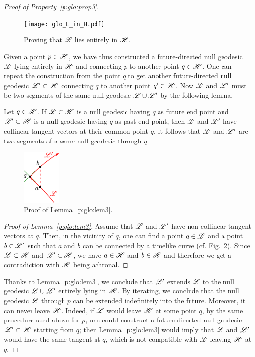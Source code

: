 \begin{proof}[Proof of Property~\ref{p:glo:prop3}]
\begin{figure}
\centerline{\texttt{[image: glo\_L\_in\_H.pdf]}}
\caption[]{\label{f:glo:L_in_H} \footnotesize
Proving that $\mathscr{L}$ lies entirely in $\mathscr{H}$.}
\end{figure}



Given a point $p\in\mathscr{H}$, we have thus constructed a
future-directed null geodesic $\mathscr{L}$ lying entirely in $\mathscr{H}$ and
connecting $p$ to another point $q\in\mathscr{H}$. One can
repeat the construction
from the point $q$ to get another future-directed null geodesic $\mathscr{L}'\subset\mathscr{H}$
connecting $q$ to another point $q'\in\mathscr{H}$. Now $\mathscr{L}$ and $\mathscr{L}'$ must
be two segments of the same null geodesic $\mathscr{L}\cup\mathscr{L}'$ by the following lemma.
\begin{lemma}
\label{p:glo:lem3}
Let $q\in\mathscr{H}$. If $\mathscr{L}\subset\mathscr{H}$ is a null geodesic having $q$ as future end point
and $\mathscr{L}'\subset\mathscr{H}$ is a null geodesic having $q$ as past end point, then
$\mathscr{L}$ and $\mathscr{L}'$ have collinear tangent vectors at their common point $q$.
It follows that $\mathscr{L}$ and $\mathscr{L}'$ are two segments of a same null geodesic through $q$.
\end{lemma}
\begin{figure}
\centerline{\includegraphics[width=0.17\textwidth]{glo_unique_geod.pdf}}
\caption[]{\label{f:glo:unique_geod} \footnotesize
Proof of Lemma~\ref{p:glo:lem3}.}
\end{figure}
\begin{proof}[Proof of Lemma~\ref{p:glo:lem3}]
Assume that $\mathscr{L}$ and $\mathscr{L}'$ have non-collinear tangent vectors at $q$. Then, in
the vicinity of $q$, one can find a point $a\in\mathscr{L}$ and a point $b\in\mathscr{L}'$
such that $a$ and $b$ can be connected by a timelike curve (cf.
Fig.~\ref{f:glo:unique_geod}). Since $\mathscr{L}\subset\mathscr{H}$ and $\mathscr{L}'\subset\mathscr{H}$, we have $a\in\mathscr{H}$ and
$b\in\mathscr{H}$ and therefore we get a contradiction with $\mathscr{H}$ being achronal.
\end{proof}
Thanks to Lemma~\ref{p:glo:lem3}, we conclude that $\mathscr{L}'$ extends $\mathscr{L}$ to the null geodesic
$\mathscr{L}\cup\mathscr{L}'$ entirely lying in $\mathscr{H}$. By iterating, we conclude that
the null geodesic $\mathscr{L}$ through $p$ can be extended indefinitely into the
future. Moreover, it can never leave $\mathscr{H}$. Indeed, if $\mathscr{L}$ would leave $\mathscr{H}$ at
some point $q$, by the same procedure used above for $p$, one could construct a future-directed null geodesic
$\mathscr{L}'\subset\mathscr{H}$ starting from $q$; then Lemma~\ref{p:glo:lem3} would imply that
$\mathscr{L}$ and $\mathscr{L}'$ would have the same tangent at $q$, which is not compatible
with $\mathscr{L}$ leaving $\mathscr{H}$ at $q$.


\end{proof}
